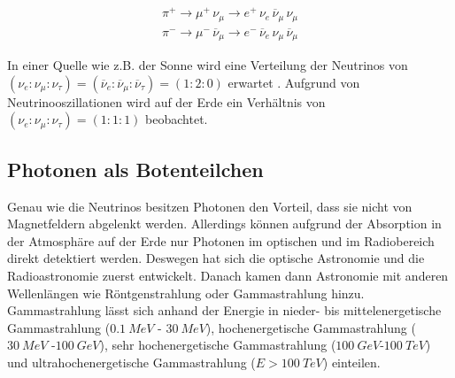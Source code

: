 \begin{equation*}
 \begin{aligned}
 \pi^+ \rightarrow \mu^+ \, \nu_{\mu} \rightarrow e^+ \, \nu_e \, \overline{\nu}_{\mu} \, \nu_{\mu} \\ 
 \pi^- \rightarrow \mu^- \, \overline{\nu}_{\mu} \rightarrow e^- \, \overline{\nu}_e \, \nu_{\mu} \, \overline{\nu}_{\mu}
 \end{aligned}
\end{equation*}


In einer Quelle wie z.B. der Sonne wird eine Verteilung der Neutrinos von $(\nu_e:\nu_{\mu}:\nu_{\tau})=(\overline{\nu}_e:\overline{\nu}_{\mu}:\overline{\nu}_{\tau})=(1:2:0)$ erwartet \cite{NeutrinoOszillation}.
Aufgrund von Neutrinooszillationen wird auf der Erde ein Verhältnis von $(\nu_e:\nu_{\mu}:\nu_{\tau})=(1:1:1)$ \cite{NeutrinoOszillation} beobachtet.



\subsection{Photonen als Botenteilchen}
\label{subsec:Photonen}
Genau wie die Neutrinos besitzen Photonen den Vorteil, dass sie nicht von Magnetfeldern abgelenkt werden.
Allerdings können aufgrund der Absorption in der Atmosphäre auf der Erde nur Photonen im optischen und im Radiobereich direkt detektiert werden.
Deswegen hat sich die optische Astronomie und die Radioastronomie zuerst entwickelt. 
Danach kamen dann Astronomie mit anderen Wellenlängen wie Röntgenstrahlung oder Gammastrahlung hinzu.
Gammastrahlung lässt sich anhand der Energie in nieder- bis mittelenergetische Gammastrahlung ($\SI{0,1}{MeV}$ - $\SI{30}{MeV}$), hochenergetische Gammastrahlung ($\SI{30}{MeV}$ -$\SI{100}{GeV}$), sehr hochenergetische Gammastrahlung ($\SI{100}{GeV}$-$\SI{100}{TeV}$) und ultrahochenergetische Gammastrahlung ($E>\SI{100}{TeV}$) einteilen.


